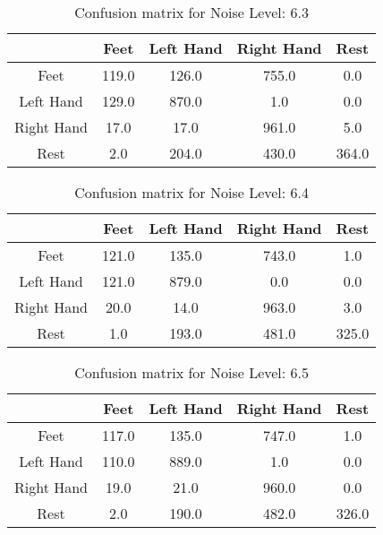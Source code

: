 \begin{table}[!htbp]
    \centering
    \begin{tabular}{|c||c|c|c|c|}
        \hline
		 & Feet & Left Hand & Right Hand & Rest \\
        \hline
        \hline
        Feet & 119.0 & 126.0 & 755.0 & 0.0 \\
        \hline
        Left Hand & 129.0 & 870.0 & 1.0 & 0.0 \\
        \hline
        Right Hand & 17.0 & 17.0 & 961.0 & 5.0 \\
        \hline
        Rest & 2.0 & 204.0 & 430.0 & 364.0 \\
        \hline
    \end{tabular}
    \caption{Confusion matrix for Noise Level: 6.3}
\end{table}

\begin{table}[!htbp]
    \centering
    \begin{tabular}{|c||c|c|c|c|}
        \hline
		 & Feet & Left Hand & Right Hand & Rest \\
        \hline
        \hline
        Feet & 121.0 & 135.0 & 743.0 & 1.0 \\
        \hline
        Left Hand & 121.0 & 879.0 & 0.0 & 0.0 \\
        \hline
        Right Hand & 20.0 & 14.0 & 963.0 & 3.0 \\
        \hline
        Rest & 1.0 & 193.0 & 481.0 & 325.0 \\
        \hline
    \end{tabular}
    \caption{Confusion matrix for Noise Level: 6.4}
\end{table}

\begin{table}[!htbp]
    \centering
    \begin{tabular}{|c||c|c|c|c|}
        \hline
		 & Feet & Left Hand & Right Hand & Rest \\
        \hline
        \hline
        Feet & 117.0 & 135.0 & 747.0 & 1.0 \\
        \hline
        Left Hand & 110.0 & 889.0 & 1.0 & 0.0 \\
        \hline
        Right Hand & 19.0 & 21.0 & 960.0 & 0.0 \\
        \hline
        Rest & 2.0 & 190.0 & 482.0 & 326.0 \\
        \hline
    \end{tabular}
    \caption{Confusion matrix for Noise Level: 6.5}
\end{table}

